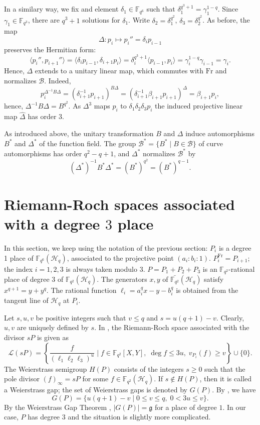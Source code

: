 \documentclass[a4paper]{amsart}
\theoremstyle{plain}
\theoremstyle{definition}
\theoremstyle{remark}
\newcommand{\Frob}{\mathrm{Fr}}
\newcommand{\g}{\mathfrak{g}}
\begin{document}
In a similary way, we fix and element $\delta_1\in \mathbb{F}_{q^6}$ such that $\delta_1^{q^3+1}=\gamma_1^{1-q}$. Since $\gamma_1 \in \mathbb{F}_{q^3}$, there are $q^3+1$ solutions for $\delta_1$. Write $\delta_2=\delta_1^{q^2}$, $\delta_3=\delta_2^{q^2}$. As before, the map 
\[\Delta:p_i\mapsto p_i''=\delta_i p_{i-1}\]
preserves the Hermitian form:
\[\langle p_i'',p_{i+1}'' \rangle = \langle \delta_{i} p_{i-1}, \delta_{i+1} p_{i} \rangle = \delta_{i}^{q^3+1} \langle p_{i-1},p_{i} \rangle = \gamma_i^{1-q} \gamma_{i-1} =\gamma_i.\]
Hence, $\Delta$ extends to a unitary linear map, which commutes with $\Frob$ and normalizes $\mathcal{B}$. Indeed,
\[ p_{i}^{\Delta^{-1}B\Delta} = (\delta_{i+1}^{-1}p_{i+1})^{B\Delta} = (\delta_{i+1}^{-1}\beta_{i+1} p_{i+1})^\Delta = \beta_{i+1} p_i, \]
hence, $\Delta^{-1}B\Delta=B^{q^2}$. As $\Delta^3$ maps $p_i$ to $\delta_1\delta_2\delta_3 p_i$ the induced projective linear map $\hat{\Delta}$ has order $3$. 

As introduced above, the unitary transformation $B$ and $\Delta$ induce automorphisms $B^*$ and $\Delta^*$ of the function field. The group $\mathcal{B}^* = \{B^* \mid B \in \mathcal{B}\}$ of curve automorphisms has order $q^2-q+1$, and $\Delta^*$ normalizes $\mathcal{B}^*$ by 
\[(\Delta^*)^{-1}B^*\Delta^*=(B^*)^{q^2}=(B^*)^{q-1}.\]




\section{Riemann-Roch spaces associated with a degree $3$ place}

In this section, we keep using the notation of the previous section: $P_i$ is a degree 1 place of $\mathbb{F}_{q^6}(\mathscr{H}_q)$, associated to the projective point $(a_i:b_i:1)$. $P_i^\Frob=P_{i+1}$; the index $i=1,2,3$ is always taken modulo $3$. $P=P_1+P_2+P_3$ is an $\mathbb{F}_{q^2}$-rational place of degree $3$ of $\mathbb{F}_{q^2}(\mathscr{H}_q)$. The generators $x,y$ of $\bar{\mathbb{F}_{q^2}}(\mathscr{H}_q)$ satisfy $x^{q+1}=y+y^q$. The rational function $\ell_i=a_i^qx-y-b_i^q$ is obtained from the tangent line of $\mathscr{H}_q$ at $P_i$. 

Let $s,u,v$ be positive integers such that $v\leq q$ and $s=u(q+1)-v$. Clearly, $u,v$ are uniquely defined by $s$. In \cite{korchmaros2013hermitian}, the Riemann-Roch space associated with the divisor $sP$ is given as
\[\mathscr{L}(sP) = \left\{ \frac{f}{(\ell_1\ell_2\ell_3)^u} \mid f \in \mathbb{F}_{q^2}[X,Y], \; \deg f \leq 3u, \; v_{P_i}(f) \geq v \right\} \cup \{0\}.\]
The Weierstrass semigroup $H(P)$ consists of the integers $s\geq 0$ such that the pole divisor $(f)_\infty=sP$ for some $f\in {\mathbb{F}_{q^2}}(\mathscr{H}_q)$. If $s\not\in H(P)$, then it is called a Weierstrass gap; the set of Weierstrass gaps is denoted by $G(P)$. By \cite[Theorem 3.1]{korchmaros2013hermitian}, we have
\[G(P) = \{u(q+1)-v \mid 0\leq v\leq q, \; 0<3u\leq v\}.\]
By the Weierstrass Gap Theorem \cite[Theorem 1.6.8]{stichtenoth2009algebraic}, $|G(P)|=\g$ for a place of degree $1$. In our case, $P$ has degree $3$ and the situation is slightly more complicated.
\end{document}
